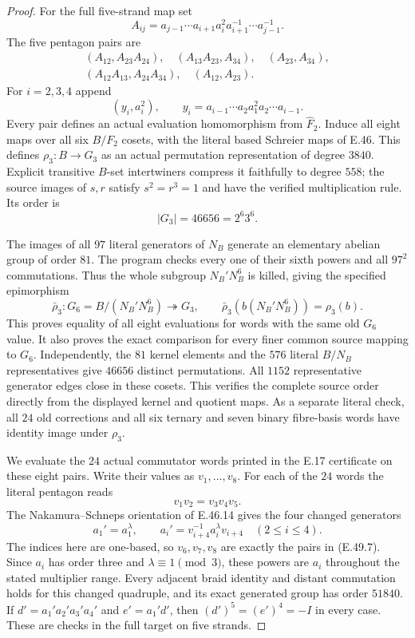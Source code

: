 \begin{proof}
For the full five-strand map set
\[
 A_{ij}=a_{j-1}\cdots a_{i+1}a_i^2
                         a_{i+1}^{-1}\cdots a_{j-1}^{-1}.
\]
The five pentagon pairs are
\[
 \begin{gathered}
 (A_{12},A_{23}A_{24}),\quad(A_{13}A_{23},A_{34}),\quad
 (A_{23},A_{34}),\\
 (A_{12}A_{13},A_{24}A_{34}),\quad(A_{12},A_{23}).
 \end{gathered}
 \tag{E.49.6}
\]
For $i=2,3,4$ append
\[
 (y_i,a_i^2),\qquad
 y_i=a_{i-1}\cdots a_2a_1^2a_2\cdots a_{i-1}.
 \tag{E.49.7}
\]
Every pair defines an actual evaluation homomorphism from
$\widehat F_2$.  Induce all eight maps over all six $B/F_2$
cosets, with the literal based Schreier maps of E.46.
This defines $\rho_3:B\to G_3$ as an actual permutation
representation of degree $3840$.  Explicit transitive
$B$-set intertwiners compress it faithfully to degree $558$;
the source images of $s,r$ satisfy $s^2=r^3=1$ and have
the verified multiplication rule.  Its order is
\[
              |G_3|=46656=2^6 3^6.
 \tag{E.49.8}
\]

The images of all $97$ literal generators of $N_B$ generate
an elementary abelian group of order $81$.  The program checks
every one of their sixth powers and all $97^2$ commutations.
Thus the whole subgroup $N_B'N_B^6$ is killed, giving the
specified epimorphism
\[
       \bar\rho_3:G_6=B/(N_B'N_B^6)\twoheadrightarrow G_3,
       \qquad \bar\rho_3(b(N_B'N_B^6))=\rho_3(b).
 \tag{E.49.9}
\]
This proves equality of all eight evaluations for words with
the same old $G_6$ value.  It also proves the exact comparison
for every finer common source mapping to $G_6$.
Independently, the $81$ kernel elements and the $576$
literal $B/N_B$ representatives give $46656$ distinct
permutations.  All $1152$ representative generator edges
close in these cosets.  This verifies the complete source
order directly from the displayed kernel and quotient maps.
As a separate literal check, all $24$ old corrections and
all six ternary and seven binary fibre-basis words have
identity image under $\rho_3$.

We evaluate the $24$ actual commutator words printed in the
E.17 certificate on these eight pairs.  Write their values
as $v_1,\ldots,v_8$.  For each of the $24$ words the literal
pentagon reads
\[
                 v_1v_2=v_3v_4v_5.
 \tag{E.49.10}
\]
The Nakamura--Schneps orientation of E.46.14 gives the
four changed generators
\[
 a_1'=a_1^\lambda,\qquad
 a_i'=v_{i+4}^{-1}a_i^\lambda v_{i+4}
                           \quad(2\leq i\leq4).
 \tag{E.49.11}
\]
The indices here are one-based, so $v_6,v_7,v_8$ are
exactly the pairs in \textup{(E.49.7)}.
Since $a_i$ has order three and $\lambda\equiv1\pmod3$,
these powers are $a_i$ throughout the stated multiplier range.
Every adjacent braid identity and distant commutation holds
for this changed quadruple, and its exact generated group
has order $51840$.  If $d'=a_1'a_2'a_3'a_4'$ and
$e'=a_1'd'$, then $(d')^5=(e')^4=-I$ in every case.
These are checks in the full target on five strands.


\end{proof}
